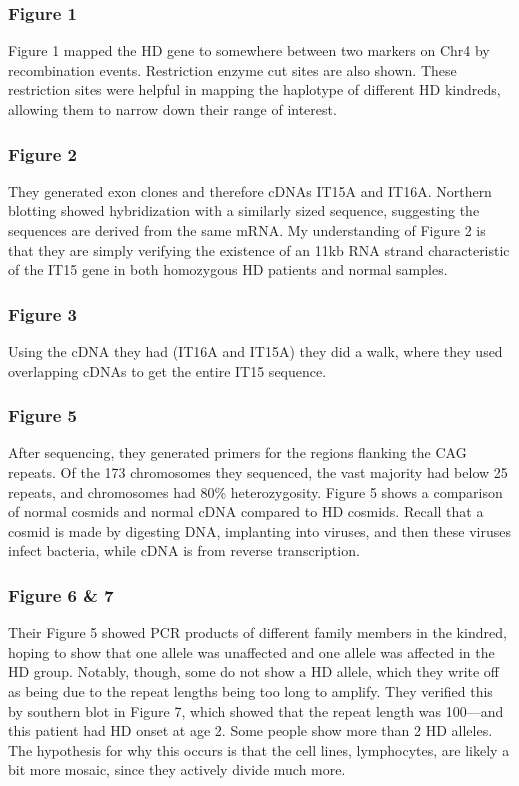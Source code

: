 \subsubsection*{Figure 1}

Figure 1 mapped the HD gene to somewhere between two markers on Chr4 by recombination events. Restriction enzyme cut sites are also shown. These restriction sites were helpful in mapping the haplotype of different HD kindreds, allowing them to narrow down their range of interest. 

\subsubsection*{Figure 2}

They generated exon clones and therefore cDNAs IT15A and IT16A. Northern blotting showed hybridization with a similarly sized sequence, suggesting the sequences are derived from the same mRNA. My understanding of Figure 2 is that they are simply verifying the existence of an 11kb RNA strand characteristic of the IT15 gene in both homozygous HD patients and normal samples. 

\subsubsection*{Figure 3}

Using the cDNA they had (IT16A and IT15A) they did a walk, where they used overlapping cDNAs to get the entire IT15 sequence. 

\subsubsection*{Figure 5}

After sequencing, they generated primers for the regions flanking the CAG repeats. Of the 173 chromosomes they sequenced, the vast majority had below 25 repeats, and chromosomes had 80\% heterozygosity. Figure 5 shows a comparison of normal cosmids and normal cDNA compared to HD cosmids. Recall that a cosmid is made by digesting DNA, implanting into viruses, and then these viruses infect bacteria, while cDNA is from reverse transcription. 

\subsubsection*{Figure 6 \& 7}
Their Figure 5 showed PCR products of different family members in the kindred, hoping to show that one allele was unaffected and one allele was affected in the HD group. Notably, though, some do not show a HD allele, which they write off as being due to the repeat lengths being too long to amplify. They verified this by southern blot in Figure 7, which showed that the repeat length was 100---and this patient had HD onset at age 2. Some people show more than 2 HD alleles. The hypothesis for why this occurs is that the cell lines, lymphocytes, are likely a bit more mosaic, since they actively divide much more. 

